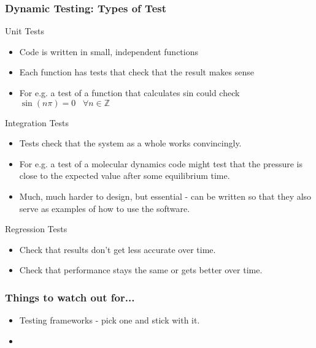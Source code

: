 \documentclass{beamer}
\begin{document}
\begin{frame}
    \frametitle{Dynamic Testing: Types of Test}
    \begin{block}{Unit Tests}
        \begin{itemize}
            \item Code is written in small, independent functions
            \item Each function has tests that check that the result makes sense
            \item For e.g. a test of a function that calculates sin could check $\sin{\left(n\pi\right)} = 0 \,\,\,\,\, \forall n \in \mathbb{Z}$
        \end{itemize}
    \end{block}

    \begin{block}{Integration Tests}
        \begin{itemize}
            \item Tests check that the system as a whole works convincingly.
            \item For e.g. a test of a molecular dynamics code might test that the pressure is close to the expected value after some equilibrium time.
            \item Much, much harder to design, but essential - can be written so that they also serve as examples of how to use the software.
        \end{itemize}
    \end{block}

    \begin{block}{Regression Tests}
        \begin{itemize}
            \item Check that results don't get less accurate over time.
            \item Check that performance stays the same or gets better over time.
        \end{itemize}
    \end{block}
\end{frame}

\begin{frame}
    \frametitle{Things to watch out for...}
    \begin{itemize}
        \item Testing frameworks - pick one and stick with it.
        \item 
    \end{itemize}
\end{frame}
\end{document}
